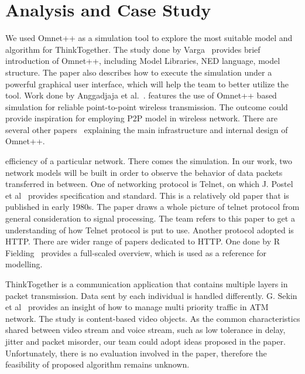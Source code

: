 \section{Analysis and Case Study}
We used Omnet++ as a simulation tool to explore the most 
suitable model and algorithm for ThinkTogether. The study done by 
Varga~\cite{A_OMNET_ESM01} 
provides brief introduction of Omnet++, including Model Libraries, NED 
language, 
model structure. The paper also describes how to execute the simulation under a 
powerful graphical user interface, which will help the team to better utilize 
the tool. Work done by Anggadjaja et al.~\cite{EI_OMNET_ACT10}. features the 
use of Omnet++ based 
simulation for reliable point-to-point wireless transmission. The outcome could 
provide inspiration for employing P2P model in wireless network. There 
are several other papers~\cite{MM_OMNET_OMN08,XX_OMNET_ICQ12} explaining the 
main infrastructure and 
internal 
design of Omnet++. 

efficiency of a particular network. There comes the simulation. 
In our work, 
two network models will be built in order to observe the behavior of data 
packets transferred in between. One of networking protocol is Telnet, on which 
J. Postel et al~\cite{JJ_TEL83} provides specification and 
standard. This is 
a relatively old paper that is published in early 1980s. The paper draws a 
whole picture of telnet protocol from general consideration to signal 
processing. The team refers to this paper to get a understanding of how Telnet 
protocol is put to use. Another protocol adopted is HTTP. There are wider range 
of papers dedicated to HTTP. One done by R Fielding~\cite{BJJH_HTTP1999} 
provides a full-scaled overview, which is used as a reference for modelling. 


ThinkTogether is a communication application that contains multiple layers in 
packet transmission. Data sent by each individual is handled differently. G. 
Sekin et al~\cite{GF_COM00} provides an insight of how to manage multi 
priority traffic in ATM network. The study is content-based video 
objects. As the common characteristics shared between video stream and voice 
stream, such as low tolerance in delay, jitter and packet misorder, our team 
could adopt ideas proposed in the paper. Unfortunately, there is no evaluation 
involved in the paper, therefore the feasibility of proposed algorithm remains 
unknown. 



